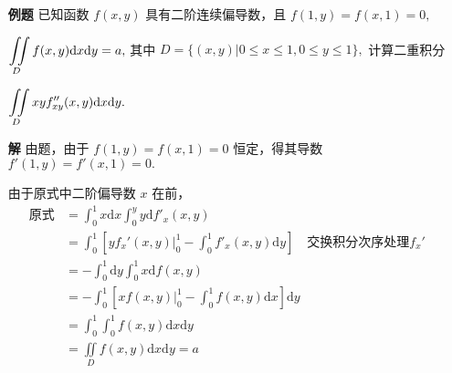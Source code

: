 \begin{itemize}
    \item[\textbf{例题}] 已知函数 $ f(x,y) $ 具有二阶连续偏导数，且 $ f(1,y) = f (x,1) = 0,$
    
    $ \displaystyle \iint\limits_{D}f(x,y)\mathrm{d}x\mathrm{d}y = a, $ 
    其中 $ D = \{(x,y)|0\leq x\leq 1, 0\leq y \leq 1\}, $ 
    计算二重积分

    $ \displaystyle \iint\limits_{D}xyf^{\prime\prime}_{xy}(x,y)\mathrm{d}x\mathrm{d}y. $ 
    \item[\textbf{解}] 
    由题，由于 $ f(1,y) = f (x,1) = 0 $ 恒定，得其导数 $ f'(1,y) = f'(x,1) = 0.$

    由于原式中二阶偏导数 $ x $ 在前，
    \begin{equation*}
        \begin{aligned}
            \textrm{原式}&= \int_0^1 x\mathrm{d}x\int_0^y y\mathrm{d}f'_x(x,y) \\ 
            &= \int_0^1 \left[yf_x'(x,y)\big|_0^1 - \int_0^1f'_x(x,y)\mathrm{d}y\right] 
            \quad{}\textrm{交换积分次序处理}f_x' \\ 
            &= -\int_0^1\mathrm{d}y\int_0^1 x\mathrm{d}f(x,y)\\ &= 
            -\int_0^1\left[xf(x,y)\big|_0^1 - \int_0^1f(x,y)\mathrm{d}x\right]\mathrm{d}y \\&= 
            \int_0^1\int_0^1f(x,y)\mathrm{d}x\mathrm{d}y \\&= 
            \iint\limits_{D}f(x,y)\mathrm{d}x\mathrm{d}y = a
        \end{aligned}
    \end{equation*}
\end{itemize}